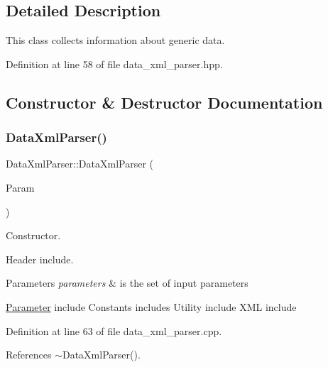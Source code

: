 \subsection{Detailed Description}
This class collects information about generic data. 

Definition at line 58 of file data\+\_\+xml\+\_\+parser.\+hpp.



\subsection{Constructor \& Destructor Documentation}
\mbox{\label{classDataXmlParser_a61f895e7ddc005480a5941d41d7f0e9a}} 
\subsubsection{\texorpdfstring{Data\+Xml\+Parser()}{DataXmlParser()}}
{\footnotesize\ttfamily Data\+Xml\+Parser\+::\+Data\+Xml\+Parser (\begin{DoxyParamCaption}\item[{const \hyperlink{Parameter_8hpp_a37841774a6fcb479b597fdf8955eb4ea}{Parameter\+Const\+Ref} \&}]{Param }\end{DoxyParamCaption})\hspace{0.3cm}{\ttfamily [explicit]}}



Constructor. 

Header include.


\begin{DoxyParams}{Parameters}
{\em parameters} & is the set of input parameters\\
\hline
\end{DoxyParams}
\hyperlink{classParameter}{Parameter} include Constants includes Utility include X\+ML include 

Definition at line 63 of file data\+\_\+xml\+\_\+parser.\+cpp.



References $\sim$\+Data\+Xml\+Parser().

